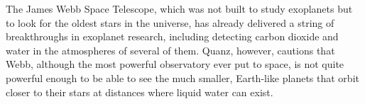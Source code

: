 The James Webb Space Telescope, which was not built to study exoplanets but to look for the oldest stars in the universe, has already delivered a string of breakthroughs in exoplanet research, including detecting carbon dioxide and water in the atmospheres of several of them. Quanz, however, cautions that Webb, although the most powerful observatory ever put to space, is not quite powerful enough to be able to see the much smaller, Earth-like planets that orbit closer to their stars at distances where liquid water can exist.
